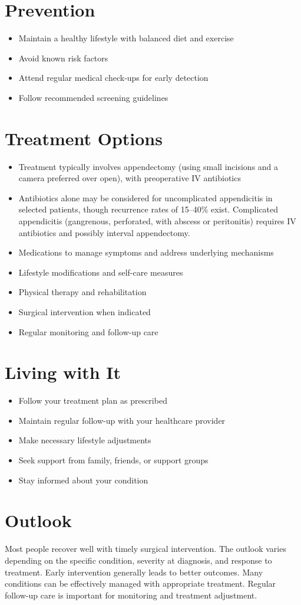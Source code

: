 \section{Prevention}
\begin{itemize}[noitemsep]
  \item Maintain a healthy lifestyle with balanced diet and exercise
  \item Avoid known risk factors
  \item Attend regular medical check-ups for early detection
  \item Follow recommended screening guidelines
\end{itemize}
\section{Treatment Options}
\begin{itemize}[noitemsep]
  \item Treatment typically involves appendectomy (using small incisions and a camera preferred over open), with preoperative IV antibiotics
  \item Antibiotics alone may be considered for uncomplicated appendicitis in selected patients, though recurrence rates of 15--40\% exist. Complicated appendicitis (gangrenous, perforated, with abscess or peritonitis) requires IV antibiotics and possibly interval appendectomy.
  \item Medications to manage symptoms and address underlying mechanisms
  \item Lifestyle modifications and self-care measures
  \item Physical therapy and rehabilitation
  \item Surgical intervention when indicated
  \item Regular monitoring and follow-up care
\end{itemize}
\section{Living with It}
\begin{itemize}[noitemsep]
  \item Follow your treatment plan as prescribed
  \item Maintain regular follow-up with your healthcare provider
  \item Make necessary lifestyle adjustments
  \item Seek support from family, friends, or support groups
  \item Stay informed about your condition
\end{itemize}
\section{Outlook}
Most people recover well with timely surgical intervention. The outlook varies depending on the specific condition, severity at diagnosis, and response to treatment. Early intervention generally leads to better outcomes. Many conditions can be effectively managed with appropriate treatment. Regular follow-up care is important for monitoring and treatment adjustment.
